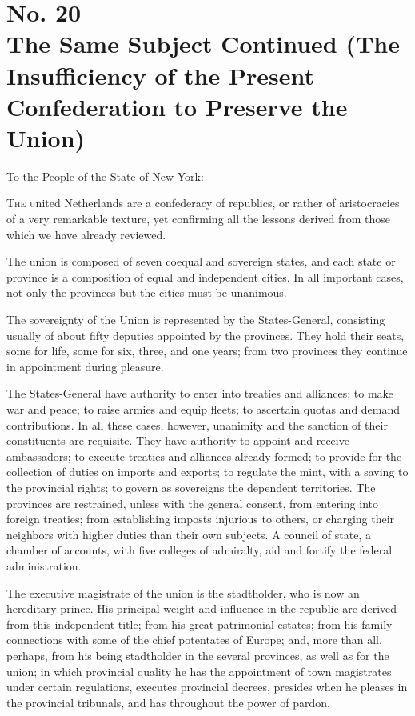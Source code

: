 \chapter[No. 20: The Same Subject Continued (The Insufficiency of the Present Confederation to Preserve the Union)]{No. 20\\ {\small The Same Subject Continued (The Insufficiency of the Present Confederation to Preserve the Union)}}
To the People of the State of New York:
\vspace{.25cm}

\textsc{The u}nited Netherlands are a confederacy of republics, or rather of aristocracies of a very remarkable texture, yet confirming all the lessons derived from those which we have already reviewed.

The union is composed of seven coequal and sovereign states, and each state or province is a composition of equal and independent cities. In all important cases, not only the provinces but the cities must be unanimous.

The sovereignty of the Union is represented by the States-General, consisting usually of about fifty deputies appointed by the provinces. They hold their seats, some for life, some for six, three, and one years; from two provinces they continue in appointment during pleasure.

The States-General have authority to enter into treaties and alliances; to make war and peace; to raise armies and equip fleets; to ascertain quotas and demand contributions. In all these cases, however, unanimity and the sanction of their constituents are requisite. They have authority to appoint and receive ambassadors; to execute treaties and alliances already formed; to provide for the collection of duties on imports and exports; to regulate the mint, with a saving to the provincial rights; to govern as sovereigns the dependent territories. The provinces are restrained, unless with the general consent, from entering into foreign treaties; from establishing imposts injurious to others, or charging their neighbors with higher duties than their own subjects. A council of state, a chamber of accounts, with five colleges of admiralty, aid and fortify the federal administration.

The executive magistrate of the union is the stadtholder, who is now an hereditary prince. His principal weight and influence in the republic are derived from this independent title; from his great patrimonial estates; from his family connections with some of the chief potentates of Europe; and, more than all, perhaps, from his being stadtholder in the several provinces, as well as for the union; in which provincial quality he has the appointment of town magistrates under certain regulations, executes provincial decrees, presides when he pleases in the provincial tribunals, and has throughout the power of pardon.

